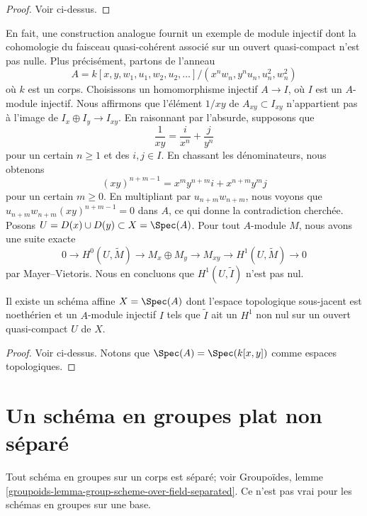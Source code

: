 \begin{proof}
Voir ci-dessus.
\end{proof}

\noindent
En fait, une construction analogue fournit un exemple de module injectif
dont la cohomologie du faisceau quasi-cohérent associé sur un ouvert
quasi-compact n'est pas nulle. Plus précisément, partons de l'anneau
$$
A = k[x, y, w_1, u_1, w_2, u_2, \ldots]/(x^nw_n, y^nu_n, u_n^2, w_n^2)
$$
où $k$ est un corps. Choisissons un homomorphisme injectif $A \to I$, où
$I$ est un $A$-module injectif. Nous affirmons que l'élément $1/xy$ de
$A_{xy} \subset I_{xy}$ n'appartient pas à l'image de
$I_x \oplus I_y \to I_{xy}$. En raisonnant par l'absurde, supposons que
$$
\frac{1}{xy} = \frac{i}{x^n} + \frac{j}{y^n}
$$
pour un certain $n \geq 1$ et des $i, j \in I$. En chassant les dénominateurs, nous obtenons
$$
(xy)^{n + m - 1} = x^my^{n + m}i + x^{n + m}y^mj
$$
pour un certain $m \geq 0$. En multipliant par $u_{n + m}w_{n + m}$,
nous voyons que $u_{n + m}w_{n + m}(xy)^{n + m - 1} = 0$ dans $A$, ce
qui donne la contradiction cherchée.
Posons $U = D(x) \cup D(y) \subset X = \Spec(A)$. Pour tout $A$-module
$M$, nous avons une suite exacte
$$
0 \to H^0(U, \widetilde{M}) \to M_x \oplus M_y \to M_{xy} \to
H^1(U, \widetilde{M}) \to 0
$$
par Mayer--Vietoris. Nous en concluons que $H^1(U, \widetilde{I})$ n'est pas nul.

\begin{lemma}
\label{lemma-nonvanishing}
Il existe un schéma affine $X = \Spec(A)$ dont l'espace
topologique sous-jacent est noethérien et un
$A$-module injectif $I$ tels que $\widetilde{I}$ ait un $H^1$ non nul
sur un ouvert quasi-compact $U$ de $X$.
\end{lemma}

\begin{proof}
Voir ci-dessus. Notons que $\Spec(A) = \Spec(k[x, y])$ comme espaces topologiques.
\end{proof}









\section{Un schéma en groupes plat non séparé}
\label{section-non-separated-group-scheme}

\noindent
Tout schéma en groupes sur un corps est séparé; voir
Groupoïdes, lemme \ref{groupoids-lemma-group-scheme-over-field-separated}.
Ce n'est pas vrai pour les schémas en groupes sur une base.

